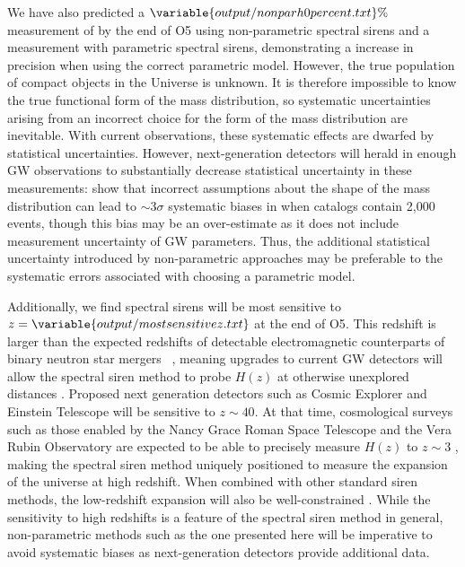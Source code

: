 \documentclass[]{aastex631}
\begin{document}
We have also predicted a $\variable{output/nonparh0percent.txt}\%$ measurement of \Ho{} by the end of \ac{O5} using non-parametric spectral sirens and a  %
measurement with parametric spectral sirens, demonstrating a  increase in precision when using the correct parametric model.
However, the true population of compact objects in the Universe is unknown.
It is therefore impossible to know the true functional form of the mass distribution, so systematic uncertainties arising from an incorrect choice for the form of the mass distribution are inevitable.
With current observations, these systematic effects are dwarfed by statistical uncertainties.
However, next-generation detectors will herald in enough \ac{GW} observations to substantially decrease statistical uncertainty in these measurements: \citet{pierra_study_2023} show that incorrect assumptions about the shape of the mass distribution can lead to $\sim3\sigma$ systematic biases in \Ho{} when catalogs contain 2,000 events, though this bias may be an over-estimate as it does not include measurement uncertainty of \ac{GW} parameters.
Thus, the additional statistical uncertainty introduced by non-parametric approaches may be preferable to the systematic errors associated with choosing a parametric model.

Additionally, we find  spectral sirens will be most sensitive to $z=\variable{output/mostsensitivez.txt}$ at the end of \acf{O5}.
This redshift is larger than the expected redshifts of detectable electromagnetic counterparts of binary neutron star mergers ~\citep{kiendrebeogo_updated_2023}, meaning  upgrades to current \ac{GW} detectors will allow the spectral siren method to probe $H(z)$ at otherwise unexplored distances . 
Proposed next generation  detectors such as Cosmic Explorer and Einstein Telescope will be sensitive to $z\sim40$.
At that time, cosmological surveys such as those enabled by the Nancy Grace Roman Space Telescope and the Vera Rubin Observatory are expected to be able to precisely measure $H(z)$ to $z\sim3$ \citep{spergel_wide-field_2015}, making the spectral siren method uniquely positioned to measure the expansion of the universe at high redshift.
When combined with other standard siren methods, the low-redshift expansion will also be well-constrained \citep{Chen:2024gdn}.
While the sensitivity to high redshifts is a feature of the spectral siren method in general, non-parametric methods such as the one presented here will be imperative to avoid systematic biases as next-generation detectors provide additional data. 
\end{document}
